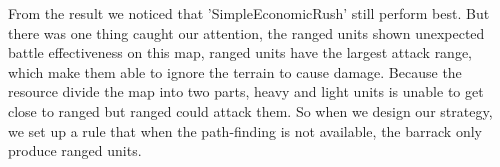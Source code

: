

From the result we noticed that 'SimpleEconomicRush' still perform best. But there was one thing caught
our attention, the ranged units shown unexpected battle effectiveness on this map, ranged units have the
largest attack range, which make them able to ignore the terrain to cause damage. Because the resource
divide the map into two parts, heavy and light units is unable to get close to ranged but ranged could
attack them. So when we design our strategy, we set up a rule that when the path-finding is not available,
the barrack only produce ranged units.
